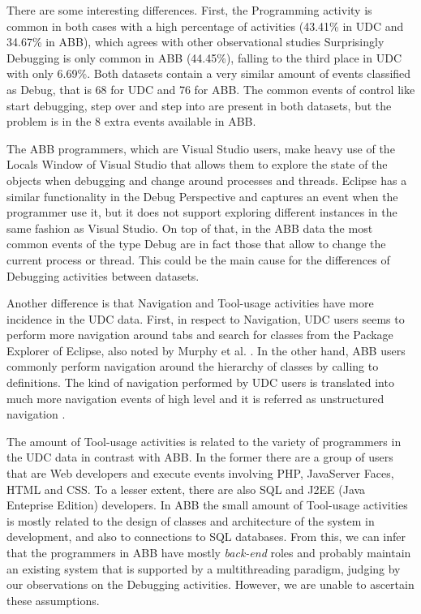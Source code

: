 \documentclass[conference]{IEEEtran}
\begin{document}
There are some interesting differences. First, the Programming activity is common in both cases with a high percentage of activities (43.41\% in UDC and 34.67\% in ABB), which agrees with other observational studies \cite{SLV10,LVD06} Surprisingly Debugging is only common in ABB (44.45\%), falling to the third place in UDC with only 6.69\%. Both datasets contain a very similar amount of events classified as Debug, that is 68 for UDC and 76 for ABB. The common events of control like start debugging, step over and step into are present in both datasets, but the problem is in the 8 extra events available in ABB. 

The ABB programmers, which are Visual Studio users, make heavy use of the Locals Window of Visual Studio that allows them to explore the state of the objects when debugging and change around processes and threads. Eclipse has a similar functionality in the Debug Perspective and captures an event when the programmer use it, but it does not support exploring different instances in the same fashion as Visual Studio. On top of that, in the ABB data the most common events of the type Debug are in fact those that allow to change the current process or thread. This could be the main cause for the differences of Debugging activities between datasets.

Another difference is that Navigation and Tool-usage activities have more incidence in the UDC data. First, in respect to Navigation, UDC users seems to perform more navigation around tabs and search for classes from the Package Explorer of Eclipse, also noted by Murphy et al. \cite{MKF06}. In the other hand, ABB users commonly perform navigation around the hierarchy of classes by calling to definitions. The kind of navigation performed by UDC users is translated into much more navigation events of high level and it is referred as unstructured navigation \cite{AFQ15}.

The amount of Tool-usage activities is related to the variety of programmers in the UDC data in contrast with ABB. In the former there are a group of users that are Web developers and execute events involving PHP, JavaServer Faces, HTML and CSS. To a lesser extent, there are also SQL and J2EE (Java Enteprise Edition) developers. In ABB the small amount of Tool-usage activities is mostly related to the design of classes and architecture of the system in development, and also to connections to SQL databases. From this, we can infer that the programmers in ABB have mostly \emph{back-end} roles and probably maintain an existing system that is supported by a multithreading paradigm, judging by our observations on the Debugging activities. However, we are unable to ascertain these assumptions.
\end{document}
